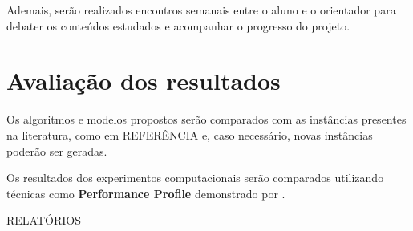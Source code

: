 \documentclass[11pt]{article}
\begin{document}
Ademais, serão realizados encontros semanais entre o aluno e o orientador para debater os conteúdos estudados e acompanhar o progresso do projeto.

\section{Avaliação dos resultados}
\label{sec:orgb100187}

Os algoritmos e modelos propostos serão comparados com as instâncias presentes na literatura, como em REFERÊNCIA e, caso necessário, novas instâncias poderão ser geradas.

Os resultados dos experimentos computacionais serão comparados utilizando técnicas como \textbf{Performance Profile} demonstrado por \textcite{Dolan2002Benchmarkingoptimizationsoftware}.

RELATÓRIOS

\printbibliography
\end{document}
